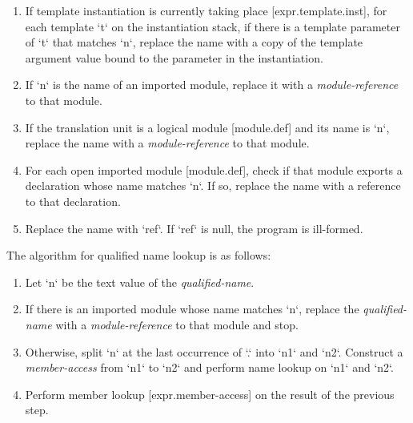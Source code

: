 \documentclass[a4paper, 12pt, oneside, final]{article}
\def\sref[#1]{[#1]}
\begin{document}
\begin{enumerate}
    \begin{enumerate}
        \item If the scope contains a declaration `d` whose name matches `n`, replace the name with a reference to `d`.
        \item If the scope contains an overload set whose name matches `n`, replace the name with a reference to that
              overload set.
        \item If a \emph{with-expression} `w` is in scope and complete [expr.with], and `w` contains a member whose name
              matches `n`, replace the name with a \emph{member-access} from `w` to `n`.
    \end{enumerate}
\item If template instantiation is currently taking place [expr.template.inst], for each template `t` on the instantiation
      stack, if there is a template parameter of `t` that matches `n`, replace the name with a copy of the template argument
      value bound to the parameter in the instantiation.
\item If `n` is the name of an imported module, replace it with a \emph{module-reference} to that module.
\item If the translation unit is a logical module [module.def] and its name is `n`, replace the name with a
      \emph{module-reference} to that module.
\item For each open imported module [module.def], check if that module exports a declaration whose name matches `n`. If so,
      replace the name with a reference to that declaration.
\item Replace the name with `ref`. If `ref` is null, the program is ill-formed.
\end{enumerate}

\noindent The algorithm for qualified name lookup is as follows:
\begin{enumerate}
\item Let `n` be the text value of the \emph{qualified-name}.
\item If there is an imported module whose name matches `n`, replace the \emph{qualified-name} with a \emph{module-reference} to that module and stop.
\item Otherwise, split `n` at the last occurrence of `.` into `n1` and `n2`. Construct a \emph{member-access} from `n1` to `n2` and
      perform name lookup on `n1` and `n2`.
\item Perform member lookup \sref[expr.member-access] on the result of the previous step.
\end{enumerate}
\end{document}
